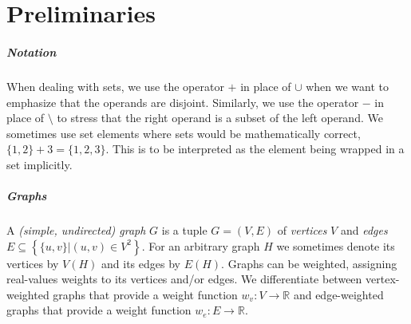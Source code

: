 \chapter{Preliminaries}
\label{chap:preliminaries}





\paragraph{Notation}

When dealing with sets, we use the operator $+$ in place of $\cup$ when we want to emphasize that the operands are disjoint.
Similarly, we use the operator $-$ in place of $\setminus$ to stress that the right operand is a subset of the left operand.
We sometimes use set elements where sets would be mathematically correct, \eg{} $\{1,2\} + 3 = \{1,2,3\}$.
This is to be interpreted as the element being wrapped in a set implicitly.


\paragraph{Graphs}

\begin{definition}
A \emph{(simple, undirected) graph} $G$ is a tuple $G = (V, E)$ of \emph{vertices} $V$ and \emph{edges} $E \subseteq \left\{\{u,v\} \vert (u,v) \in V^2 \right\}$.
For an arbitrary graph $H$ we sometimes denote its vertices by $V(H)$ and its edges by $E(H)$.
Graphs can be weighted, assigning real-values weights to its vertices and/or edges.
We differentiate between vertex-weighted graphs that provide a weight function $w_v \colon V \to \mathbb{R}$ and edge-weighted graphs that provide a weight function $w_e \colon E \to \mathbb{R}$.
\end{definition}

